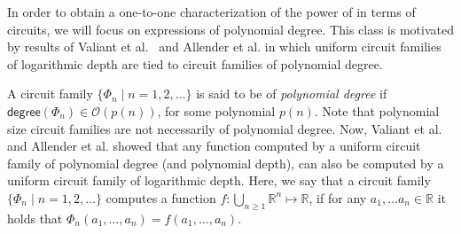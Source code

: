 %

In order to obtain a one-to-one characterization of the power of \langfor in terms of circuits, we will focus on \langfor expressions of polynomial degree.
This class is motivated by results of Valiant et al.~\cite{valiant1981fast} and Allender et al. \cite{AllenderJMV98} in which uniform circuit families of logarithmic depth are tied to circuit families of polynomial degree.


A circuit family $\{\Phi_n\mid n=1,2,\ldots\}$ is said to be of \textit{polynomial degree} if $\mathsf{degree}(\Phi_n)\in \mathcal O(p(n))$, for some polynomial $p(n)$. Note that polynomial size circuit families are not necessarily of polynomial degree. Now, Valiant et al.~\cite{valiant1981fast} and Allender et al. \cite{AllenderJMV98} showed that any function computed by a uniform circuit family of polynomial degree (and polynomial depth), can also be computed by a uniform circuit family of logarithmic depth. Here, we say that  a circuit family $\{\Phi_n\mid n=1,2,\ldots\}$ computes a function $f:\bigcup_{n\geq 1} \mathbb{R}^n\mapsto\mathbb{R}$, if for any $a_1,\ldots a_n\in \mathbb{R}$ it holds that $\Phi_n(a_1,\ldots ,a_n) = f(a_1,\ldots ,a_n)$. 


